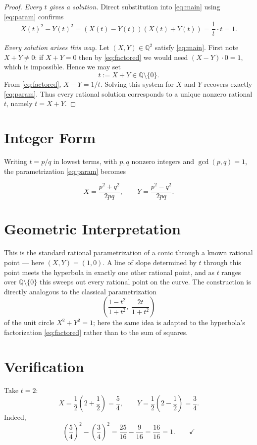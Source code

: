 \documentclass[11pt]{article}
\begin{document}
\begin{proof}
\emph{Every $t$ gives a solution.} Direct substitution into \eqref{eq:main} using \eqref{eq:param} confirms
\[
X(t)^2 - Y(t)^2 = (X(t)-Y(t))(X(t)+Y(t)) = \frac{1}{t}\cdot t = 1.
\]

\emph{Every solution arises this way.} Let $(X,Y) \in \mathbb{Q}^2$ satisfy \eqref{eq:main}. First note $X + Y \neq 0$: if $X+Y = 0$ then by \eqref{eq:factored} we would need $(X-Y)\cdot 0 = 1$, which is impossible. Hence we may set
\[
t := X + Y \in \mathbb{Q}\setminus\{0\}.
\]
From \eqref{eq:factored}, $X - Y = 1/t$. Solving this system for $X$ and $Y$ recovers exactly \eqref{eq:param}. Thus every rational solution corresponds to a unique nonzero rational $t$, namely $t = X+Y$.
\end{proof}

\section{Integer Form}

Writing $t = p/q$ in lowest terms, with $p, q$ nonzero integers and $\gcd(p,q) = 1$, the parametrization \eqref{eq:param} becomes

\begin{equation}
X = \frac{p^2 + q^2}{2pq}, \qquad Y = \frac{p^2 - q^2}{2pq}.
\end{equation}

\section{Geometric Interpretation}

This is the standard rational parametrization of a conic through a known rational point --- here $(X,Y) = (1,0)$. A line of slope determined by $t$ through this point meets the hyperbola in exactly one other rational point, and as $t$ ranges over $\mathbb{Q}\setminus\{0\}$ this sweeps out every rational point on the curve. The construction is directly analogous to the classical parametrization
\[
\left(\frac{1-t^2}{1+t^2}, \; \frac{2t}{1+t^2}\right)
\]
of the unit circle $X^2 + Y^2 = 1$; here the same idea is adapted to the hyperbola's factorization \eqref{eq:factored} rather than to the sum of squares.

\section{Verification}

Take $t = 2$:
\[
X = \frac{1}{2}\left(2 + \frac{1}{2}\right) = \frac{5}{4}, \qquad Y = \frac{1}{2}\left(2 - \frac{1}{2}\right) = \frac{3}{4}.
\]
Indeed,
\[
\left(\frac{5}{4}\right)^2 - \left(\frac{3}{4}\right)^2 = \frac{25}{16} - \frac{9}{16} = \frac{16}{16} = 1. \qquad \checkmark
\]
\end{document}
